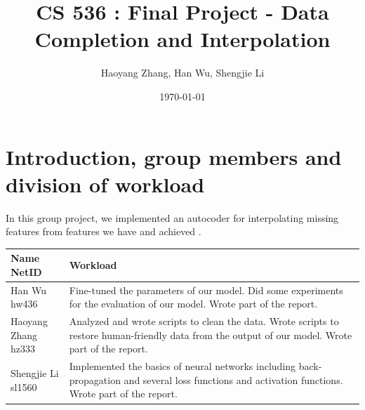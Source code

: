 \documentclass[11pt, a4paper]{article}
\title{CS 536 : Final Project - Data Completion and Interpolation}
\author{Haoyang Zhang, Han Wu, Shengjie Li}
\date{\today}
\begin{document}
\maketitle

\section{Introduction, group members and division of workload}
\label{sec:Introduction}

In this group project, we implemented an autocoder for interpolating missing features from features we have and achieved . \\
\begin{tabular}{| p{2.7cm} | p{\textwidth -3.5cm} |}
	\hline
	\makecell[c]{Name \\ NetID} & Workload \\
	\hline
	\makecell[c]{Han Wu \\ hw436} & {Fine-tuned the parameters of our model. Did some experiments for the evaluation of our model. Wrote part of the report.} \\
	\hline
	\makecell[c]{Haoyang Zhang \\ hz333} & {Analyzed and wrote scripts to clean the data. Wrote scripts to restore human-friendly data from the output of our model. Wrote part of the report. } \\
	\hline
	\makecell[c]{Shengjie Li \\ sl1560} & {Implemented the basics of neural networks including back-propagation and several loss functions and activation functions. Wrote part of the report.} \\
	\hline
\end{tabular}
\end{document}
